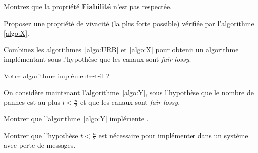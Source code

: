 \begin{exercice}
  \begin{algorithm}
    \caption{Algorithme $X$ (code pour $p_i$)}
    \label{algo:X}
  \end{algorithm}

  \begin{questions}
  \item Montrez que la propriété \textbf{Fiabilité} n'est pas respectée. 
  \item Proposez une propriété de vivacité (la plus forte possible) vérifiée par l'algorithme \ref{algo:X}. 
  \item Combinez les algorithmes~\ref{algo:URB} et~\ref{algo:X} pour obtenir un algorithme
    implémentant  sous l'hypothèse que les canaux sont \emph{fair lossy}.
  \item Votre algorithme implémente-t-il  ?
  \end{questions}

  On considère maintenant l'algorithme~\ref{algo:Y}, sous l'hypothèse que le nombre de pannes
  est au plus $t < \frac{n}{2}$ et que les canaux sont \emph{fair lossy}.

\begin{algorithm}


  \caption{\textsc{urb}-broadcast avec une majorité de corrects et des canaux fair lossy. (code pour $p_i$)}
  \label{algo:Y}
\end{algorithm}

  \begin{questions}
  \item Montrer que l'algorithme~\ref{algo:Y} implémente . 
  \item Montrer que l'hypothèse $t < \frac{n}{2}$ est nécessaire pour implémenter  dans un système avec perte de messages. 
  \end{questions}

\end{exercice}

\endgroup
\endinput
